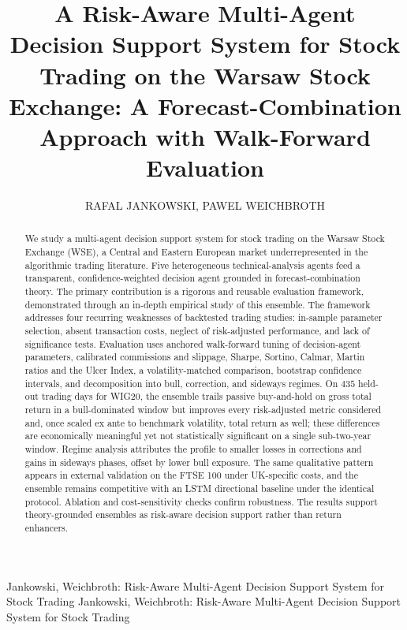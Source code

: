 \documentclass{ieeeaccess}
\newcommand{\OOSDays}{\ensuremath{435}}
\begin{document}

\title{A Risk-Aware Multi-Agent Decision Support System for Stock Trading on the Warsaw Stock Exchange: A Forecast-Combination Approach with Walk-Forward Evaluation}

\author{\uppercase{Rafal Jankowski},
\uppercase{Pawel Weichbroth}}

\address[1]{Faculty of Electronics, Telecommunications, and Informatics, Gdańsk University of Technology, 80-233 Gdańsk, Poland}
\address[2]{Faculty of Electronics, Telecommunications, and Informatics, Gdańsk University of Technology, 80-233 Gdańsk, Poland}


\markboth
{Jankowski, Weichbroth: Risk-Aware Multi-Agent Decision Support System for Stock Trading}
{Jankowski, Weichbroth: Risk-Aware Multi-Agent Decision Support System for Stock Trading}


\begin{abstract}
We study a multi-agent decision support system for stock trading on the Warsaw Stock Exchange (WSE), a Central and Eastern European market underrepresented in the algorithmic trading literature. Five heterogeneous technical-analysis agents feed a transparent, confidence-weighted decision agent grounded in forecast-combination theory. The primary contribution is a rigorous and reusable evaluation framework, demonstrated through an in-depth empirical study of this ensemble. The framework addresses four recurring weaknesses of backtested trading studies: in-sample parameter selection, absent transaction costs, neglect of risk-adjusted performance, and lack of significance tests. Evaluation uses anchored walk-forward tuning of decision-agent parameters, calibrated commissions and slippage, Sharpe, Sortino, Calmar, Martin ratios and the Ulcer Index, a volatility-matched comparison, bootstrap confidence intervals, and decomposition into bull, correction, and sideways regimes. On \OOSDays{} held-out trading days for WIG20, the ensemble trails passive buy-and-hold on gross total return in a bull-dominated window but improves every risk-adjusted metric considered and, once scaled ex ante to benchmark volatility, total return as well; these differences are economically meaningful yet not statistically significant on a single sub-two-year window. Regime analysis attributes the profile to smaller losses in corrections and gains in sideways phases, offset by lower bull exposure. The same qualitative pattern appears in external validation on the FTSE 100 under UK-specific costs, and the ensemble remains competitive with an LSTM directional baseline under the identical protocol. Ablation and cost-sensitivity checks confirm robustness. The results support theory-grounded ensembles as risk-aware decision support rather than return enhancers.
\end{abstract}
\end{document}
